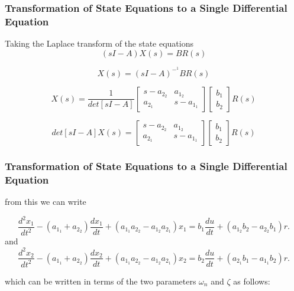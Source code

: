 \documentclass{beamer}
\numberwithin{equation}{section}
\begin{document}
\begin{frame}
\frametitle{Transformation of State Equations to a Single Differential Equation}
\begin{description}[font=$\bullet$~\normalfont\scshape\color{red!50!black}]
 Taking the Laplace transform of the state equations
$$(sI - A)X(s)  =  BR(s)$$
\end{description}
\begin{description}
$$X(s)  =  (sI - A)^-^1BR(s)$$
\end{description}
\begin{description}
$$X(s)  = \frac{1}{det[sI - A]}\begin{bmatrix} s - a_2_2 & a_1_2 \\ a_2_1 & s - a_1_1 
\end{bmatrix}\left[\begin{array}{c} b_1 \\ b_2\end{array}\right]R(s) $$
\end{description}
\begin{description}
$$det [sI - A]X(s) = \begin{bmatrix} s - a_2_2 & a_1_2 \\ a_2_1 & s - a_1_1 
\end{bmatrix}\left[\begin{array}{c} b_1 \\ b_2\end{array}\right]R(s)$$
\end{description}
\end{frame}

\begin{frame}
\frametitle{Transformation of State Equations to a Single Differential Equation}
\begin{description}[font=$\bullet$~\normalfont\scshape\color{red!50!black}]
from this we can write
\end{description}
\begin{description}
$$\dfrac{d^2x_1}{dt^2} - (a_1_1 + a_2_2)\dfrac{dx_1}{dt} + (a_1_1a_2_2 - a_1_2a_2_1)x_1 = b_1\dfrac{du}{dt} + (a_1_2b_2 - a_2_2b_1)r.$$
and
$$\dfrac{d^2x_2}{dt^2} - (a_1_1 + a_2_2)\dfrac{dx_2}{dt} + (a_1_1a_2_2 - a_1_2a_2_1)x_2 = b_2\dfrac{du}{dt} + (a_2_1b_1 - a_1_1b_2)r.$$
\end{description}

\begin{description}
which can be written in terms of the two parameters $\omega_n$ and $\zeta$ as follows: 
\end{description}
\end{frame}
\end{document}
